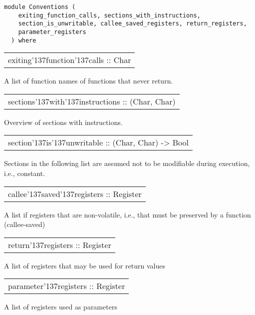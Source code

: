 \label{module:Conventions}
\haddockbeginheader
{\haddockverb\begin{verbatim}
module Conventions (
    exiting_function_calls, sections_with_instructions,
    section_is_unwritable, callee_saved_registers, return_registers,
    parameter_registers
  ) where\end{verbatim}}
\haddockendheader

\begin{haddockdesc}
\item[\begin{tabular}{@{}l}
exiting{\char '137}function{\char '137}calls :: {\char 91}{\char 91}Char{\char 93}{\char 93}
\end{tabular}]
{\haddockbegindoc
A list of function names of functions that never return.\par}
\end{haddockdesc}
\begin{haddockdesc}
\item[\begin{tabular}{@{}l}
sections{\char '137}with{\char '137}instructions :: {\char 91}({\char 91}Char{\char 93}, {\char 91}Char{\char 93}){\char 93}
\end{tabular}]
{\haddockbegindoc
Overview of sections with instructions.\par}
\end{haddockdesc}
\begin{haddockdesc}
\item[\begin{tabular}{@{}l}
section{\char '137}is{\char '137}unwritable :: ({\char 91}Char{\char 93}, {\char 91}Char{\char 93}) -> Bool
\end{tabular}]
{\haddockbegindoc
Sections in the following list are assumed not to be modifiable during execution, i.e., constant.\par}
\end{haddockdesc}
\begin{haddockdesc}
\item[\begin{tabular}{@{}l}
callee{\char '137}saved{\char '137}registers :: {\char 91}Register{\char 93}
\end{tabular}]
{\haddockbegindoc
A list if registers that are non-volatile, i.e., that must be preserved by a function (callee-saved)\par}
\end{haddockdesc}
\begin{haddockdesc}
\item[\begin{tabular}{@{}l}
return{\char '137}registers :: {\char 91}Register{\char 93}
\end{tabular}]
{\haddockbegindoc
A list of registers that may be used for return values\par}
\end{haddockdesc}
\begin{haddockdesc}
\item[\begin{tabular}{@{}l}
parameter{\char '137}registers :: {\char 91}Register{\char 93}
\end{tabular}]
{\haddockbegindoc
A list of registers used as parameters\par}
\end{haddockdesc}